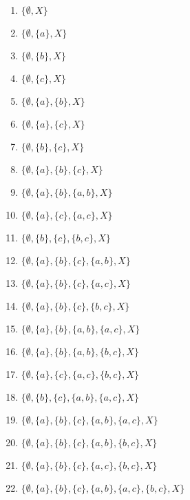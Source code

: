 \begin{multicols}{2}
\begin{enumerate}
  \item \(\{\emptyset, X\}\)
  \item \(\{\emptyset, \{a\}, X\}\)
  \item \(\{\emptyset, \{b\}, X\}\)
  \item \(\{\emptyset, \{c\}, X\}\)
  \item \(\{\emptyset, \{a\}, \{b\}, X\}\)
  \item \(\{\emptyset, \{a\}, \{c\}, X\}\)
  \item \(\{\emptyset, \{b\}, \{c\}, X\}\)
  \item \(\{\emptyset, \{a\}, \{b\}, \{c\}, X\}\)
  \item \(\{\emptyset, \{a\}, \{b\}, \{a,b\}, X\}\)
  \item \(\{\emptyset, \{a\}, \{c\}, \{a,c\}, X\}\)
  \item \(\{\emptyset, \{b\}, \{c\}, \{b,c\}, X\}\)
  \item \(\{\emptyset, \{a\}, \{b\}, \{c\}, \{a,b\}, X\}\)
  \item \(\{\emptyset, \{a\}, \{b\}, \{c\}, \{a,c\}, X\}\)
  \item \(\{\emptyset, \{a\}, \{b\}, \{c\}, \{b,c\}, X\}\)
  \item \(\{\emptyset, \{a\}, \{b\}, \{a,b\}, \{a,c\}, X\}\)
  \item \(\{\emptyset, \{a\}, \{b\}, \{a,b\}, \{b,c\}, X\}\)
  \item \(\{\emptyset, \{a\}, \{c\}, \{a,c\}, \{b,c\}, X\}\)
  \item \(\{\emptyset, \{b\}, \{c\}, \{a,b\}, \{a,c\}, X\}\)
  \item \(\{\emptyset, \{a\}, \{b\}, \{c\}, \{a,b\}, \{a,c\}, X\}\)
  \item \(\{\emptyset, \{a\}, \{b\}, \{c\}, \{a,b\}, \{b,c\}, X\}\)
  \item \(\{\emptyset, \{a\}, \{b\}, \{c\}, \{a,c\}, \{b,c\}, X\}\)
  \item \(\{\emptyset, \{a\}, \{b\}, \{c\}, \{a,b\}, \{a,c\}, \{b,c\}, X\}\)
\end{enumerate}
\end{multicols}
